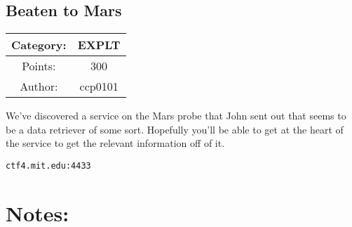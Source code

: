 \begin{center}
\section*{Beaten to Mars}
{\large
\begin{tabular}{| c c |}
\hline
Category: & EXPLT\\\hline
Points: & 300\\\hline
Author: & ccp0101\\\hline
\end{tabular}
}
\end{center}
\vspace{0.5in}

{\large
We've discovered a service on the Mars probe that John sent out that seems to be a data retriever of some sort. Hopefully you'll be able to get at the heart of the service to get the relevant information off of it.
}
\vspace{0.25in}
\begin{center}
  {\Large\tt ctf4.mit.edu:4433}
\end{center}

\vspace{0.25in}
\section*{Notes:}
